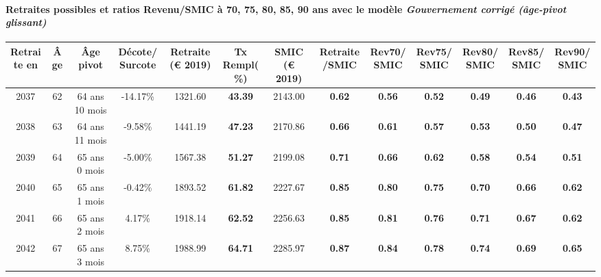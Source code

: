\paragraph{Retraites possibles et ratios Revenu/SMIC à 70, 75, 80, 85, 90 ans avec le modèle \emph{Gouvernement corrigé (âge-pivot glissant)}}  
 
{ \scriptsize \begin{center} 
\begin{tabular}[htb]{|c|c||c|c||c|c||c||c|c|c|c|c|c|} 
\hline 
 Retraite en &  Âge &  Âge pivot &  Décote/Surcote &  Retraite (\euro{} 2019) &  Tx Rempl(\%) &  SMIC (\euro{} 2019) &  Retraite/SMIC &  Rev70/SMIC &  Rev75/SMIC &  Rev80/SMIC &  Rev85/SMIC &  Rev90/SMIC \\ 
\hline \hline 
 2037 &  62 &  64 ans 10 mois &  -14.17\% &  1321.60 &  {\bf 43.39} &  2143.00 &  {\bf {\color{red} 0.62}} &  {\bf {\color{red} 0.56}} &  {\bf {\color{red} 0.52}} &  {\bf {\color{red} 0.49}} &  {\bf {\color{red} 0.46}} &  {\bf {\color{red} 0.43}} \\ 
\hline 
 2038 &  63 &  64 ans 11 mois &  -9.58\% &  1441.19 &  {\bf 47.23} &  2170.86 &  {\bf {\color{red} 0.66}} &  {\bf {\color{red} 0.61}} &  {\bf {\color{red} 0.57}} &  {\bf {\color{red} 0.53}} &  {\bf {\color{red} 0.50}} &  {\bf {\color{red} 0.47}} \\ 
\hline 
 2039 &  64 &  65 ans 0 mois &  -5.00\% &  1567.38 &  {\bf 51.27} &  2199.08 &  {\bf {\color{red} 0.71}} &  {\bf {\color{red} 0.66}} &  {\bf {\color{red} 0.62}} &  {\bf {\color{red} 0.58}} &  {\bf {\color{red} 0.54}} &  {\bf {\color{red} 0.51}} \\ 
\hline 
 2040 &  65 &  65 ans 1 mois &  -0.42\% &  1893.52 &  {\bf 61.82} &  2227.67 &  {\bf {\color{red} 0.85}} &  {\bf {\color{red} 0.80}} &  {\bf {\color{red} 0.75}} &  {\bf {\color{red} 0.70}} &  {\bf {\color{red} 0.66}} &  {\bf {\color{red} 0.62}} \\ 
\hline 
 2041 &  66 &  65 ans 2 mois &  4.17\% &  1918.14 &  {\bf 62.52} &  2256.63 &  {\bf {\color{red} 0.85}} &  {\bf {\color{red} 0.81}} &  {\bf {\color{red} 0.76}} &  {\bf {\color{red} 0.71}} &  {\bf {\color{red} 0.67}} &  {\bf {\color{red} 0.62}} \\ 
\hline 
 2042 &  67 &  65 ans 3 mois &  8.75\% &  1988.99 &  {\bf 64.71} &  2285.97 &  {\bf {\color{red} 0.87}} &  {\bf {\color{red} 0.84}} &  {\bf {\color{red} 0.78}} &  {\bf {\color{red} 0.74}} &  {\bf {\color{red} 0.69}} &  {\bf {\color{red} 0.65}} \\ 
\hline 
\hline 
\end{tabular} 
\end{center} } 
